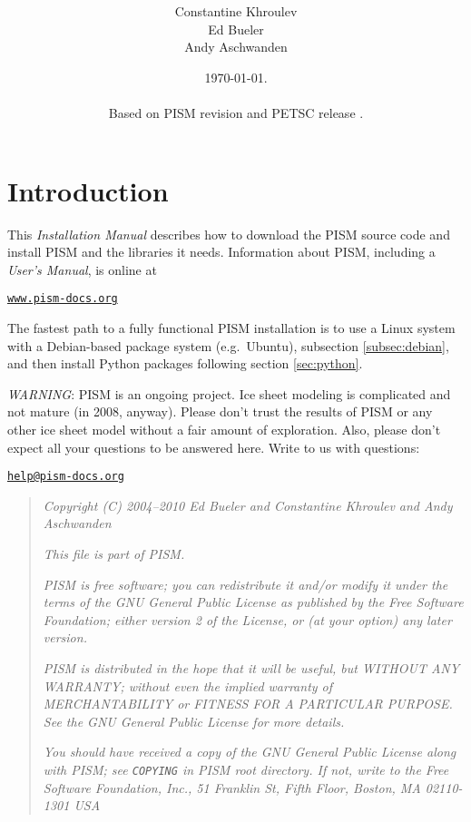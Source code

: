 \documentclass[11pt,final]{amsart}
\title[PISM Installation Manual]{\protect{\Large \emph{PISM}, a Parallel Ice
    Sheet Model:\normalsize} \\ \protect{\Large \bigskip \bigskip Installation
    Manual\normalsize}}
\author[]{Constantine Khroulev \\ Ed Bueler \\ Andy Aschwanden}
\date{\today.\\  \PISMDOWNLOADMSG\\
Based on PISM revision \PISMREV\quad and PETSC release \PETSCREL.}
\renewcommand{\t}[1]{\texttt{#1}}
\begin{document}
\maketitle
\thispagestyle{empty}

\vspace{1.5in}
\setcounter{tocdepth}{2}
\tableofcontents



\newpage
\section*{Introduction}

\large
This \emph{Installation Manual} describes how to download the PISM source code and install PISM and the libraries it needs.  Information about PISM, including a \emph{User's Manual}, is online at
\bigskip
\begin{center}
  \href{http://www.pism-docs.org}{\t{www.pism-docs.org}}
\end{center}
\bigskip
\noindent The fastest path to a fully functional PISM installation is to use a Linux system with a Debian-based package system (e.g.~Ubuntu), subsection \ref{subsec:debian}, and then install Python packages following section \ref{sec:python}.
\vfill

\noindent\emph{WARNING}:  PISM is an ongoing project.  Ice sheet modeling is complicated and not mature (in 2008, anyway).  Please don't trust the results of PISM or any other ice sheet model without a fair amount of exploration.  Also, please don't expect all your questions to be answered here.  Write to us with questions: \bigskip

\centerline{\href{mailto:help@pism-docs.org}{\texttt{help@pism-docs.org}}}
\vfill

\begin{quote}
\textsl{Copyright (C) 2004--2010 Ed Bueler and Constantine Khroulev and Andy Aschwanden}
\medskip

\noindent \textsl{This file is part of PISM.}
\medskip

\noindent \textsl{PISM is free software; you can redistribute it and/or modify it under the terms of the GNU General Public
  License as published by the Free Software Foundation; either version 2 of the License, or (at your option) any later version.}
\medskip

\noindent \textsl{PISM is distributed in the hope that it will be useful, but WITHOUT ANY WARRANTY; without even the implied
  warranty of MERCHANTABILITY or FITNESS FOR A PARTICULAR PURPOSE. See the GNU General Public License for more details.} \medskip

\noindent \textsl{You should have received a copy of the GNU General Public License along
  with PISM; see \emph{\texttt{COPYING}} in PISM root directory. If not, write to the Free Software Foundation, Inc., 51 Franklin
  St, Fifth Floor, Boston, MA 02110-1301 USA}
\end{quote}
\end{document}
